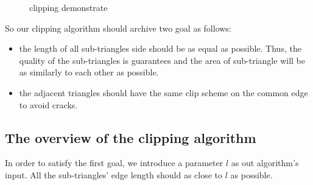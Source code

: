 \documentclass[3p]{elsarticle}
\begin{document}
\begin{figure}
  \centering
  \hfill
  \hfill
  \caption{clipping demonstrate}
  \label{fig:clip_quality}
\end{figure}

So our clipping algorithm should archive two goal as follows:
\begin{itemize}
    \item the length of all sub-triangles side should be as equal as possible. Thus, the quality of the sub-triangles is guarantees and the area of sub-triangle will be as similarly to each other as possible.
    \item the adjacent triangles should have the same clip scheme on the common edge to avoid cracks.
\end{itemize}

\subsection{The overview of the clipping algorithm}
In order to satisfy the first goal, we introduce a parameter $l$ as out algorithm's input. All the sub-triangles' edge length should as close to $l$ as possible.
\end{document}
